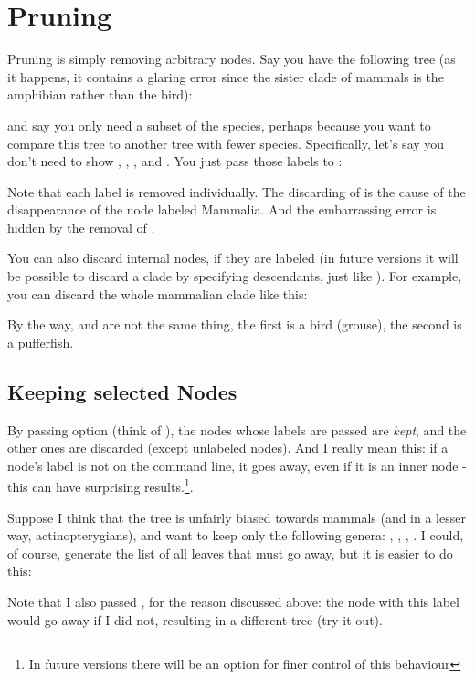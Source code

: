 \section[sct_prune]{Pruning}


Pruning is simply removing arbitrary nodes. Say you have the following tree (as
it happens, it contains a glaring error since the sister clade of mammals is the
amphibian rather than the bird):


and say you only need a subset of the species, perhaps because you
want to compare this tree to another tree with fewer species. Specifically,
let's say you don't need to show , ,
, and . You just pass those labels to
\prune:


Note that each label is removed individually. The discarding of
 is the cause of the disappearance of the node labeled
Mammalia. And the embarrassing error is hidden by the removal of
.

You can also discard internal nodes, if they are labeled (in future versions
it will be possible to discard a clade by specifying descendants, just like
\clade). For example, you can discard the whole mammalian clade like this:


By the way,  and  are not the same thing, the
first is a bird (grouse), the second is a pufferfish.

\subsection{Keeping selected Nodes}

By passing option  (think of ), the nodes whose
labels are passed are {\em kept}, and the other ones are discarded (except
unlabeled nodes). And I really mean this: if a node's label is not on the
command line, it goes away, even if it is an inner node - this can have
surprising results.\footnote{In future versions there will be an option for
finer control of this behaviour}.

Suppose I think that the tree is unfairly biased towards mammals (and in a
lesser way, actinopterygians), and want to keep only the following genera:
, , , . I could, of
course, generate the list of all leaves that must go away, but it is easier to
do this:


Note that I also passed , for the reason discussed
above: the node with this label would go away if I did not, resulting in a
different tree (try it out).
